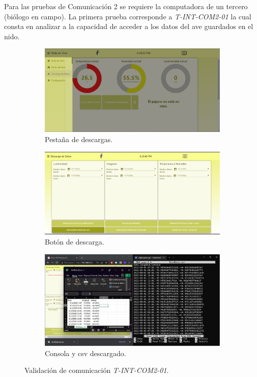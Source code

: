Para las pruebas de Comunicación 2 se requiere la computadora de un tercero (biólogo en campo). La primera prueba corresponde a \textit{T-INT-COM2-01} la cual consta en analizar a la capacidad de acceder a los datos del ave guardados en el nido.
\begin{figure}[H]
	\centering
	\begin{subfigure}{0.49\textwidth}
		\centering
		\includegraphics[width=\linewidth]{ImagenesValidacion del prototipo/TINTCOM21a}		
		\caption{Pestaña de descargas.}
	\end{subfigure}\hfill
	\begin{subfigure}{0.49\textwidth}
		\centering
		\includegraphics[width=\linewidth]{ImagenesValidacion del prototipo/TINTCOM21b}
		\caption{Botón de descarga.}
	\end{subfigure}
	\caption*{}
\end{figure}
\begin{figure}[H]
	\ContinuedFloat
	\centering
	\begin{subfigure}{\textwidth}
		\centering
		\includegraphics[width=0.8\linewidth]{ImagenesValidacion del prototipo/TINTCOM21}
		\caption{Consola y csv descargado.}
	\end{subfigure}
	\caption{Validación de comunicación \textit{T-INT-COM2-01}.}
\end{figure}

